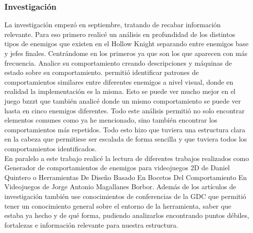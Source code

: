 \subsubsection{Investigación}
La investigación empezó en septiembre, tratando de recabar información relevante. Para eso primero realicé un análisis en profundidad de los distintos tipos de enemigos que existen en el Hollow Knight separando entre enemigos base y jefes finales. Centrándome en los primeros ya que son los que aparecen con más frecuencia. Analice su comportamiento creando descripciones y máquinas de estado sobre su comportamiento.   permitió identificar patrones de comportamientos similares entre diferentes enemigos a nivel visual, donde en realidad la implementación es la misma. Esto se puede ver mucho mejor en el juego bzzzt que también analicé donde un mismo comportamiento se puede ver hasta en cinco enemigos diferentes. Todo este análisis permitió no solo encontrar elementos comunes como ya he mencionado, sino también encontrar los comportamientos más repetidos.
Todo esto hizo que tuviera una estructura clara en la cabeza que permitiese ser escalada de forma sencilla y que tuviera todos los comportamientos identificados.\\
En paralelo a este trabajo realicé la lectura de diferentes trabajos realizados como Generador de comportamientos de enemigos para videojuegos 2D de Daniel Quintero o Herramientas De Diseño Basado En Bocetos Del Comportamiento En Videojuegos de Jorge Antonio Magallanes Borbor. Además de los artículos de investigación también use conocimientos de conferencias de la GDC que permitió tener un conocimiento general sobre el  entorno de la herramienta, saber que estaba ya hecho y de qué forma, pudiendo analizarlos encontrando puntos débiles, fortalezas e información relevante para nuestra estructura.

